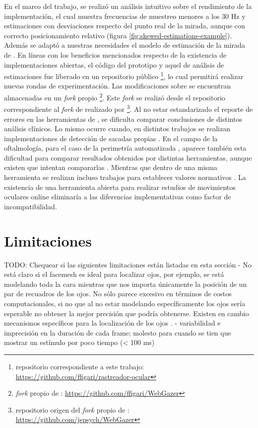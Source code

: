 En el marco del trabajo, se realizó un análisis intuitivo sobre el rendimiento
de la implementación, el cual muestra frecuencias de muestreo menores a los 30
Hz y estimaciones con desviaciones respecto del punto real de la mirada, aunque
con correcto posicionamiento relativo (figura
\ref{fig:skewed-estimations-example}).
Además se adaptó a nuestras necesidades el modelo de estimación de la mirada de
\webgazer.
En líneas con los beneficios mencionados respecto de la existencia de
implementaciones abiertas, el código del prototipo y aquel de análisis de
estimaciones fue liberado en un repositorio público \footnote{repositorio
correspondiente a este trabajo:
\url{https://github.com/ffigari/rastreador-ocular}}, lo cual permitirá
realizar nuevas rondas de experimentación.
Las modificaciones sobre \webgazer se encuentran almacenadas en un
\textit{fork} propio \footnote{\textit{fork} propio de \webgazer:
\url{https://github.com/ffigari/WebGazer}}.
Este \textit{fork} se realizó desde el repositorio correspondiente al
\textit{fork} de \webgazer realizado por \jspsych \footnote{repositorio origen
del \textit{fork} propio de \webgazer:
\url{https://github.com/jspsych/WebGazer}}.
Al no estar estandarizado el reporte de errores en las herramientas de
\eyetracking \cite{zandi_2021_pupilext}, se dificulta comparar conclusiones de
distintos análisis clínicos.
Lo mismo ocurre cuando, en distintos trabajos se realizan implementaciones de
detección de sacadas propias \cite{salvucci_2000_identifying_fixations}.
En el campo de la oftalmología, para el caso de la perimetría automatizada
\cite{pubmed_1996_automated_perimetry}, aparece también esta dificultad para
comparar resultados obtenidos por distintas herramientas, aunque existen que
intentan compararlas \cite{landers_2007_automated_perimeters_comparison}.
Mientras que dentro de una misma herramienta se realizan incluso trabajos para
establecer valores normativos \cite{brenton_1986_humphrey_normal_visual_field}.
La existencia de una herramienta abierta para realizar estudios de movimientos
oculares online eliminaría a las diferencias implementativas como factor de
incompatibilidad.

\section{Limitaciones}

TODO: Chequear si las siguientes limitaciones están listadas en esta sección
- No está claro si el facemesh es ideal para localizar ojos, por ejemplo, se
está modelando toda la cara mientras que nos importa únicamente la posición de
un par de recuadros de los ojos.
No sólo parece excesivo en términos de costos computacionales, si no que al no
estar modelando específicamente los ojos sería esperable no obtener la mejor
precisión que podría obtenerse.
Existen en cambio mecanismos específicos para la localización de los ojos
\cite{hansen_2009_eye_of_the_beholder}.
- variabilidad e imprecisión en la duración de cada frame; molesto para cuando
se tien que mostrar un estímulo por poco tiempo (< 100 ms)



